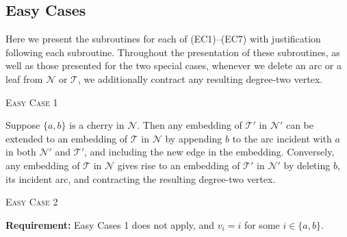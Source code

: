\documentclass[11pt]{amsart}
\begin{document}
\subsection{Easy Cases}
\label{easycases}
\setcounter{algorithm}{0}

Here we present the subroutines for each of (EC1)--(EC7) with justification following each subroutine. Throughout the presentation of these subroutines, as well as those presented for the two special cases, whenever we delete an arc or a leaf from ${{\mathcal N}}$ or ${{\mathcal T}}$, we additionally contract any resulting degree-two vertex.

\begin{algorithm}[H]
 \caption{\textsc{Easy Case 1}}
\begin{algorithmic}[1]
 \end{algorithmic}
\end{algorithm}
Suppose $\{a, b\}$ is a cherry in ${{\mathcal N}}$. Then any embedding of ${{\mathcal T}}'$ in ${{\mathcal N}}'$ can be extended to an embedding of ${{\mathcal T}}$ in ${{\mathcal N}}$ by appending $b$ to the arc incident with $a$ in both ${{\mathcal N}}'$ and ${{\mathcal T}}'$, and including the new edge in the embedding. Conversely, any embedding of ${{\mathcal T}}$ in ${{\mathcal N}}$ gives rise to an embedding of ${{\mathcal T}}'$ in ${{\mathcal N}}'$ by deleting $b$, its incident arc, and contracting the resulting degree-two vertex.

\begin{algorithm}[H]
 \caption{\textsc{Easy Case 2}}
\begin{algorithmic}[1]
 \Statex\textbf{Requirement:} Easy Cases 1 does not apply, and $v_i=i$ for some $i\in \{a, b\}$.
       \label{AlgStep5a}
      \label{AlgStep5b}
       \EndIf
               \label{AlgStep5bii}
                \EndIf
 \end{algorithmic}
\end{algorithm}
\end{document}
